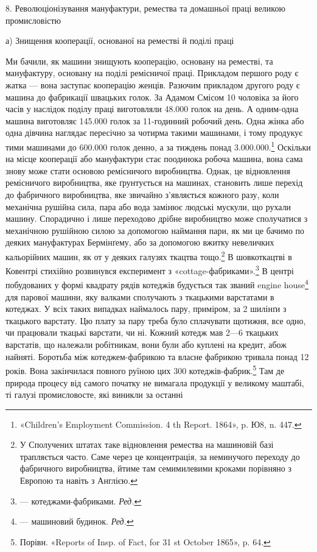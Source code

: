 \parcont{}  %
8. Революціонізування мануфактури, ремества та домашньої
праці великою промисловістю

а) Знищення кооперації, основаної
на реместві й поділі праці

Ми бачили, як машини знищують кооперацію, основану на
реместві, та мануфактуру, основану на поділі ремісничої
праці. Прикладом першого роду є жатка — вона заступає кооперацію
женців. Разючим прикладом другого роду є машина до
фабрикації швацьких голок. За Адамом Смісом 10 чоловіка за
його часів у наслідок поділу праці виготовляли 48.000 голок на
день. А одним-одна машина виготовляє 145.000 голок за 11-годинний
робочий день. Одна жінка або одна дівчина наглядає
пересічно за чотирма такими машинами, і тому продукує тими
машинами до 600.000 голок денно, а за тиждень понад 3.000.000.\footnote{
«Children’s Employment Commission. 4 th Report. 1864», p. Ю8,
n. 447.
}
Оскільки на місце кооперації або мануфактури стає поодинока
робоча машина, вона сама знову може стати основою ремісничого
виробництва. Однак, це відновлення ремісничого виробництва,
яке ґрунтується на машинах, становить лише перехід до фабричного
виробництва, яке звичайно з’являється кожного разу, коли
механічна рушійна сила, пара або вода замінює людські мускули,
що рухали машину. Спорадично і лише переходово дрібне виробництво
може сполучатися з механічною рушійною силою за
допомогою наймання пари, як ми це бачимо по деяких мануфактурах
Бермінґему, або за допомогою вжитку невеличких кальорійних
машин, як от у деяких галузях ткацтва тощо.\footnote{
У Сполучених штатах таке відновлення ремества на машиновій
базі трапляється часто. Саме через це концентрація, за неминучого переходу
до фабричного виробництва, йтиме там семимилевими кроками порівняно
з Европою та навіть з Англією.
} В шовкоткацтві
в Ковентрі стихійно розвинувся експеримент з «cottage-фабриками».\footnote*{
— котеджами-фабриками. \emph{Ред.}
}
В центрі побудованих у формі квадрату рядів котеджів
будується так званий engine house\footnote*{
— машиновий будинок. \emph{Ред.}
} для парової машини,
яку валками сполучають з ткацькими варстатами в котеджах.
У всіх таких випадках наймалось пару, приміром, за 2 шилінґи
з ткацького варстату. Цю плату за пару треба було сплачувати
щотижня, все одно, чи працювали ткацькі варстати, чи ні. Кожний
котедж мав 2—6 ткацьких варстатів, що належали робітникам,
вони були або куплені на кредит, абож найняті. Боротьба між
котеджем-фабрикою та власне фабрикою тривала понад 12 років.
Вона закінчилася повного руїною цих 300 котеджів-фабрик.\footnote{
Порівн. «Reports of Insp. of Fact, for 31 st October 1865», p. 64.
} Там
де природа процесу від самого початку не вимагала продукції у великому
маштабі, ті галузі промисловосте, які виникли за останні
\parbreak{}  %
